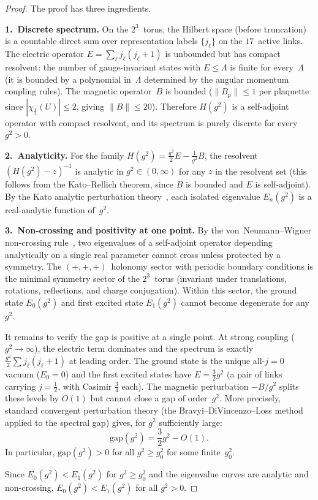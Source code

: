 \documentclass[12pt,a4paper]{article}
\newcommand{\half}{\tfrac{1}{2}}
\begin{document}
\begin{proof}
The proof has three ingredients.

\textbf{1.~Discrete spectrum.} On the $2^3$~torus, the Hilbert space (before truncation) is a countable direct sum over representation labels $\{j_\ell\}$ on the $17$~active links. The electric operator $E=\sum_\ell j_\ell(j_\ell+1)$ is unbounded but has compact resolvent: the number of gauge-invariant states with $E\le\Lambda$ is finite for every~$\Lambda$ (it is bounded by a polynomial in~$\Lambda$ determined by the angular momentum coupling rules). The magnetic operator~$B$ is bounded ($\|B_p\|\le 1$ per plaquette since $|\chi_\half(U)|\le 2$, giving $\|B\|\le 20$). Therefore $H(g^2)$ is a self-adjoint operator with compact resolvent, and its spectrum is purely discrete for every $g^2>0$.

\textbf{2.~Analyticity.} For the family $H(g^2) = \frac{g^2}{2}E - \frac{1}{g^2}B$, the resolvent $(H(g^2)-z)^{-1}$ is analytic in $g^2\in(0,\infty)$ for any $z$ in the resolvent set (this follows from the Kato--Rellich theorem, since $B$ is bounded and $E$ is self-adjoint). By the Kato analytic perturbation theory~\cite{Kato}, each isolated eigenvalue $E_n(g^2)$ is a real-analytic function of~$g^2$.

\textbf{3.~Non-crossing and positivity at one point.} By the von~Neumann--Wigner non-crossing rule~\cite{vNW}, two eigenvalues of a self-adjoint operator depending analytically on a single real parameter cannot cross unless protected by a symmetry. The $(+,+,+)$~holonomy sector with periodic boundary conditions is the minimal symmetry sector of the $2^3$~torus (invariant under translations, rotations, reflections, and charge conjugation). Within this sector, the ground state $E_0(g^2)$ and first excited state $E_1(g^2)$ cannot become degenerate for any $g^2$.

It remains to verify the gap is positive at a single point. At strong coupling ($g^2\to\infty$), the electric term dominates and the spectrum is exactly $\frac{g^2}{2}\sum j_\ell(j_\ell+1)$ at leading order. The ground state is the unique all-$j=0$ vacuum ($E_0=0$) and the first excited states have $E=\frac{3}{2}g^2$ (a pair of links carrying $j=\half$, with Casimir $\frac{3}{4}$ each). The magnetic perturbation $-B/g^2$ splits these levels by $O(1)$ but cannot close a gap of order~$g^2$. More precisely, standard convergent perturbation theory (the Bravyi--DiVincenzo--Loss method~\cite{BDL} applied to the spectral gap) gives, for $g^2$ sufficiently large:
\begin{equation}\label{eq:strong_coupling_gap}
\mathrm{gap}(g^2) = \frac{3}{2}g^2 - O(1).
\end{equation}
In particular, $\mathrm{gap}(g^2)>0$ for all $g^2\ge g_0^2$ for some finite~$g_0^2$.

Since $E_0(g^2)<E_1(g^2)$ for $g^2\ge g_0^2$ and the eigenvalue curves are analytic and non-crossing, $E_0(g^2)<E_1(g^2)$ for all $g^2>0$.
\end{proof}
\end{document}
